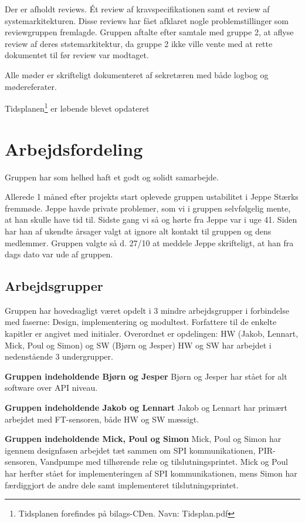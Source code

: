 Der er afholdt reviews. Ét review af kravspecifikationen samt et review af systemarkitekturen. 
Disse reviews har fået afklaret nogle problemstillinger som reviewgruppen fremlagde. 
Gruppen aftalte efter samtale med gruppe 2, at aflyse review af deres ststemarkitektur, da gruppe 2 ikke ville vente med at rette dokumentet til før review var modtaget.  

Alle møder er skrifteligt dokumenteret af sekretæren med både logbog og mødereferater. 

Tidsplanen\footnote{Tidsplanen forefindes på bilags-CDen. Navn: Tidsplan.pdf} er løbende blevet opdateret 

\section{Arbejdsfordeling}

Gruppen har som helhed haft et godt og solidt samarbejde. 

Allerede 1 måned efter projekts start oplevede gruppen ustabilitet i Jeppe Stærks fremmøde. Jeppe havde private problemer, som vi i gruppen selvfølgelig mente, at han skulle have tid til. Sidste gang vi så og hørte fra Jeppe var i uge 41. Siden har han af ukendte årsager valgt at ignore alt kontakt til gruppen og dens medlemmer. Gruppen valgte så d. 27/10 at meddele Jeppe skrifteligt, at han fra dags dato var ude af gruppen.     

\subsection{Arbejdsgrupper}
Gruppen har hovedsagligt været opdelt i 3 mindre arbejdsgrupper i forbindelse med faserne: Design, implementering og modultest. Forfattere til de enkelte kapitler er angivet med initialer.
Overordnet er opdelingen: HW (Jakob, Lennart, Mick, Poul og Simon) og SW (Bjørn og Jesper) 
HW og SW har arbejdet i nedenstående 3 undergrupper.

\textbf{Gruppen indeholdende Bjørn og Jesper} \newline
Bjørn og Jesper har stået for alt software over API niveau.

\textbf{Gruppen indeholdende Jakob og Lennart} \newline
Jakob og Lennart har primært arbejdet med FT-sensoren, både HW og SW mæssigt.

\textbf{Gruppen indeholdende Mick, Poul og Simon} \newline
Mick, Poul og Simon har igennem designfasen arbejdet tæt sammen om SPI kommunikationen, PIR-sensoren, Vandpumpe med tilhørende relæ og tilslutningsprintet. Mick og Poul har herfter stået for implementeringen af SPI kommunikationen, mens Simon har færdiggjort de andre dele samt implementeret tilslutningsprintet.


